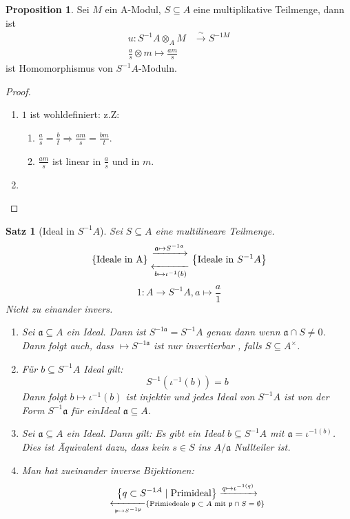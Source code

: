 \documentclass[10pt,a4paper]{article}
\newcommand{\isomfunc}{\ensuremath{\xrightarrow{\sim}}}
\newcounter{thm}[section]
\theoremstyle{definition}
\newtheorem{prop}[thm]{Proposition}
\theoremstyle{plain}
\newtheorem{satz}[thm]{Satz}
\theoremstyle{remark}
\begin{document}
\begin{prop}
	Sei $M$ ein A-Modul, $S\subseteq A$ eine multiplikative Teilmenge, dann ist
	\begin{align*}
	u:S^{-1}A\otimes_A M&\isomfunc S^{-1 M}\\
	\frac{a}{s}\otimes m\mapsto \frac{am}{s}
	\end{align*}
	ist Homomorphismus von $S^{-1}A$-Moduln.
\end{prop}
\begin{proof}
	\begin{enumerate}
		\item $1$ ist wohldefiniert: z.Z:
		\begin{enumerate}
			\item $\frac{a}{s}=\frac{b}{t}\Rightarrow \frac{am}{s}=\frac{bm}{t}$.
			\item $\frac{am}{s}$ ist linear in $\frac{a}{s}$ und in $m$.
		\end{enumerate}
		\item %
	\end{enumerate}
\end{proof}
\begin{satz}[Ideal in $S^{-1}A$]
	Sei $S\subseteq A$ eine multilineare Teilmenge.
	\begin{align*}
	\left\{\text{Ideale in A}\right\}
	{\xrightarrow{\mathfrak a\mapsto S^{-1\mathfrak a}}\atop \xleftarrow[b\mapsto \iota^{-1}(b)]{}
	}\left\{\text{Ideale in $S^{-1}A$}\right\}
	\end{align*}
	\[1:A\rightarrow S^{-1}A,a\mapsto \frac{a}{1}\]
	Nicht zu einander invers.
	\begin{enumerate}
		\item Sei $\mathfrak a\subseteq A$ ein Ideal. Dann ist $S^{-1\mathfrak a}=S^{-1}A$ genau dann wenn $\mathfrak a\cap S\neq 0$.\\
		Dann folgt auch, dass $\mathfrak\mapsto S^{-1\mathfrak a}$ ist nur invertierbar , falls $S\subseteq A^\times$.
		\item Für $b\subseteq S^{-1}A$ Ideal gilt:\\
		\[S^{-1}(\iota^{-1}(b))=b\]
		Dann folgt $b\mapsto\iota^{-1}(b)$ ist injektiv und jedes Ideal von $S^{-1}A$ ist von der Form $S^{-1}\mathfrak a$ für einIdeal $\mathfrak a\subseteq A$.
		\item Sei $\mathfrak a\subseteq A$ ein Ideal. Dann gilt:
		Es gibt ein Ideal $b\subseteq S^{-1}A$ mit $\mathfrak a=\iota^{-1(b)}$.\\
		Dies ist Äquivalent dazu, dass kein $s\in S$ ins $A/\mathfrak a$ Nullteiler ist.
		\item Man hat zueinander inverse Bijektionen: \label{4104}
		\[\left\{q\subset S^{-1 A}\mid \text{Primideal}\right\}
		\xrightarrow{q\mapsto\iota^{-1(q)}}\atop\xleftarrow[\mathfrak p\mapsto S^{-1\mathfrak p}]{}\left\{\text{Primiedeale $\mathfrak p\subset A$ mit $\mathfrak p\cap S=\emptyset$}\right\}
		\]
	\end{enumerate}
\end{satz}
\end{document}
